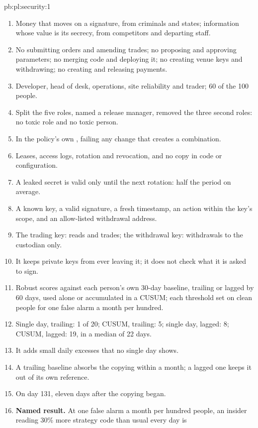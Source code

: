 \begin{solution}{pb:pl:security:1}
\begin{enumerate}
\item Money that moves on a signature, from criminals and states; information whose value is its secrecy, from competitors and departing staff.
\item No submitting orders and amending trades; no proposing and approving parameters; no merging code and deploying it; no creating venue
keys and withdrawing; no creating and releasing payments.
\item Developer, head of desk, operations, site reliability and trader; 60 of the 100 people.
\item Split the five roles, named a release manager, removed the three second roles: no toxic role and no toxic person.
\item In the policy's own , failing any change that creates a combination.
\item Leases, access logs, rotation and revocation, and no copy in code or configuration.
\item A leaked secret is valid only until the next rotation: half the period on average.
\item A known key, a valid signature, a fresh timestamp, an action within the key's scope, and an allow-listed withdrawal address.
\item The trading key: reads and trades; the withdrawal key: withdrawals to the custodian only.
\item It keeps private keys from ever leaving it; it does not check what it is asked to sign.
\item Robust scores against each person's own 30-day baseline, trailing or lagged by 60 days, used alone or accumulated in a CUSUM; each threshold
set on clean people for one false alarm a month per hundred.
\item Single day, trailing: 1 of 20; CUSUM, trailing: 5; single day, lagged: 8; CUSUM, lagged: 19, in a median of 22 days.
\item It adds small daily excesses that no single day shows.
\item A trailing baseline absorbs the copying within a month; a lagged one keeps it out of its own reference.
\item On day 131, eleven days after the copying began.
\item \textbf{Named result.} At one false alarm a month per hundred people, an insider reading 30\% more strategy code than usual every day is

\end{enumerate}
\end{solution}
